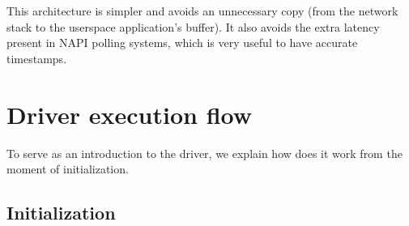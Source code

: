 \documentclass[oneside]{hpman}
\begin{document}
This architecture is simpler and avoids an unnecessary copy (from the network stack to the userspace application's buffer). It also avoids the extra latency present in NAPI polling systems, which is very useful to have accurate timestamps.

\section{Driver execution flow}

To serve as an introduction to the driver, we explain how does it work from the moment of initialization.

\subsection{Initialization}
\end{document}

